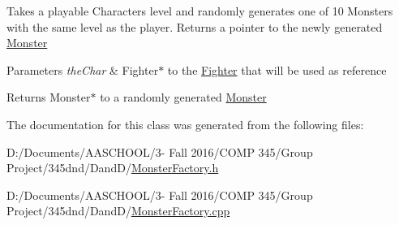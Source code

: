 Takes a playable Character\textquotesingle{}s level and randomly generates one of 10 Monsters with the same level as the player. Returns a pointer to the newly generated \hyperlink{class_monster}{Monster} 
\begin{DoxyParams}{Parameters}
{\em the\+Char} & Fighter$\ast$ to the \hyperlink{class_fighter}{Fighter} that will be used as reference \\
\hline
\end{DoxyParams}
\begin{DoxyReturn}{Returns}
Monster$\ast$ to a randomly generated \hyperlink{class_monster}{Monster} 
\end{DoxyReturn}


The documentation for this class was generated from the following files\+:\begin{DoxyCompactItemize}
\item 
D\+:/\+Documents/\+A\+A\+S\+C\+H\+O\+O\+L/3-\/ Fall 2016/\+C\+O\+M\+P 345/\+Group Project/345dnd/\+Dand\+D/\hyperlink{_monster_factory_8h}{Monster\+Factory.\+h}\item 
D\+:/\+Documents/\+A\+A\+S\+C\+H\+O\+O\+L/3-\/ Fall 2016/\+C\+O\+M\+P 345/\+Group Project/345dnd/\+Dand\+D/\hyperlink{_monster_factory_8cpp}{Monster\+Factory.\+cpp}\end{DoxyCompactItemize}
